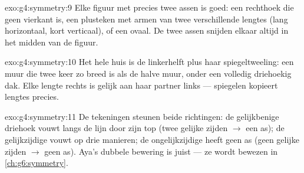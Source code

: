 \begin{solution}{exo:g4:symmetry:9}
Elke figuur met precies twee assen is goed: een rechthoek die geen vierkant
is, een plusteken met armen van twee verschillende lengtes (lang horizontaal,
kort verticaal), of een ovaal. De twee assen snijden elkaar altijd in het
midden van de figuur.
\end{solution}

\begin{solution}{exo:g4:symmetry:10}
Het hele huis is de linkerhelft plus haar spiegeltweeling: een muur die twee
keer zo breed is als de halve muur, onder een volledig driehoekig dak. Elke
lengte rechts is gelijk aan haar partner links --- spiegelen kopieert lengtes
precies.
\end{solution}

\begin{solution}{exo:g4:symmetry:11}
De tekeningen steunen beide richtingen: de gelijkbenige driehoek vouwt langs
de lijn door zijn top (twee gelijke zijden $\to$ een as); de gelijkzijdige
vouwt op drie manieren; de ongelijkzijdige heeft geen as (geen gelijke zijden
$\to$ geen as). Aya's dubbele bewering is juist --- ze wordt bewezen in
\cref{ch:g6:symmetry}.
\end{solution}
